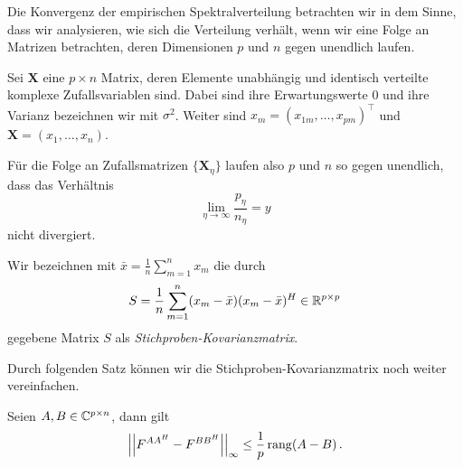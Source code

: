 \documentclass[../Bachelor_LennartKoliwer.tex]{subfiles}
\begin{document}
Die Konvergenz der empirischen Spektralverteilung betrachten wir in dem Sinne, dass wir analysieren, wie sich die Verteilung verhält, wenn wir eine Folge an Matrizen betrachten, deren Dimensionen $p$ und $n$ gegen unendlich laufen.

\begin{definition}\label{def:Zufallsmatrix}
    Sei $\bm{X}$ eine ${p\times n}$ Matrix, deren Elemente unabhängig und identisch verteilte komplexe Zufallsvariablen sind. 
    Dabei sind ihre Erwartungswerte $0$ und ihre Varianz bezeichnen wir mit $\sigma^2$. 
    Weiter sind $x_m=\left(x_{1m},\dots,x_{pm}\right)^\top$ und $\bm{X}=(x_1,\dots,x_n)$.
\end{definition}

Für die Folge an Zufallsmatrizen $\{\bm{X}_\eta\}$ laufen also $p$ und $n$ so gegen unendlich, dass das Verhältnis
\[
    \lim_{\eta\to\infty} \frac{p_\eta}{n_\eta} = y
\]
nicht divergiert.

\begin{definition}
    Wir bezeichnen mit $\bar{x}=\frac1n\sum_{m=1}^n x_m$ die durch
    \begin{align}
        S = \frac{1}{n}\sum_{m=1}^{n}(x_m-\bar{x})(x_m-\bar{x})^H\in\mathbb{R}^{p\times p} \label{eq:StichKovar}
    \end{align}
    gegebene Matrix $S$ als \emph{Stichproben-Kovarianzmatrix}.
\end{definition}

Durch folgenden Satz können wir die Stichproben-Kovarianzmatrix noch weiter vereinfachen.

\begin{theorem}\label{theo:ESDrang1}
    Seien $A,B\in\mathbb{C}^{p\times n}$, dann gilt 
    \begin{align*}
        \left\vert\left\vert F^{AA^H}-F^{BB^H} \right\vert\right\vert_\infty\leq\frac1p\operatorname{rang}(A-B)\,.
    \end{align*}
\end{theorem}
\end{document}
